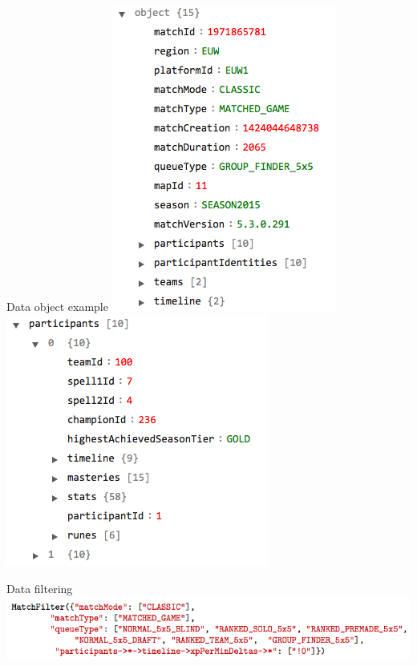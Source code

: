 \begin{frame}{Data object example}
\includegraphics[scale=0.5]{leagueoflegends/gameobject}
\includegraphics[scale=0.5]{leagueoflegends/participant}
\end{frame}
\begin{frame}{Data filtering}
\includegraphics[scale=0.4]{leagueoflegends/mf}
\end{frame}
